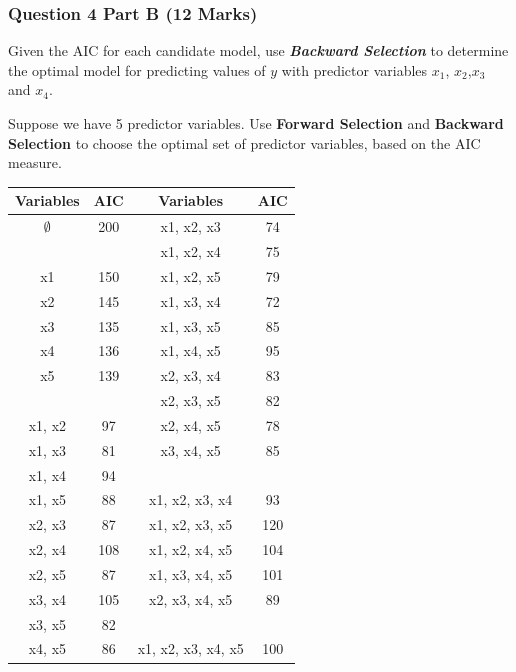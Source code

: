 \documentclass[a4paper,12pt]{article}
\begin{document}
	\newpage

\subsubsection*{Question 4 Part B (12 Marks)}

Given the AIC for each candidate model, use \textbf{\textit{Backward Selection}} to determine the optimal model for predicting values of $y$ with predictor variables
$x_1$, $x_2$,$x_3$ and $x_4$.

 Suppose we have 5 predictor variables.
Use \textbf{Forward Selection} and \textbf{Backward Selection} to choose the optimal set of predictor variables, based on the AIC measure.

{
	\large
	\begin{center}
		\begin{tabular}{||c|c||c|c||}
			\hline
			Variables & AIC & Variables & AIC \\ \hline \hline
			$\emptyset$	&	200	&	x1, x2, x3	&	74	\\ \hline
			\phantom{makemakespace}
			&	\phantom{makespace}
			&	x1, x2, x4	&	75	\\ \hline
			x1	&	150	&	x1, x2, x5	&	79	\\ \hline
			x2	&	145	&	x1, x3, x4	&	72	\\ \hline
			x3	&	135	&	x1, x3, x5	&	85	\\ \hline
			x4	&	136	&	x1, x4, x5	&	95	\\ \hline
			x5	&	139	&	x2, x3, x4	&	83	\\ \hline
			&		&	x2, x3, x5	&	82	\\ \hline
			x1, x2	&	97	&	x2, x4, x5	&	78	\\ \hline
			x1, x3	&	81	&	x3, x4, x5	&	85	\\ \hline
			x1, x4	&	94	&	\phantom{makemakespace}
			&	\phantom{makespace}
			\\ \hline
			x1, x5	&	88	&	x1, x2, x3, x4	&	93	\\ \hline
			x2, x3	&	87	&	x1, x2, x3, x5	&	120	\\ \hline
			x2, x4	&	108	&	x1, x2, x4, x5	&	104	\\ \hline
			x2, x5	&	87	&	x1, x3, x4, x5	&	101	\\ \hline
			x3, x4	&	105	&	x2, x3, x4, x5	&	89	\\ \hline
			x3, x5	&	82	&		&		\\ \hline
			x4, x5	&	86	&	x1, x2, x3, x4, x5	&	100	\\ \hline
		\end{tabular} 
	\end{center}
}
\newpage
\end{document}
